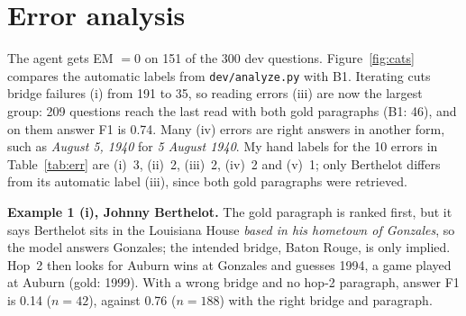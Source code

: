 \documentclass[10pt,a4paper]{article}
\begin{document}
\section{Error analysis}
\noindent\begin{minipage}[t]{0.50\textwidth}
\vspace{0pt}
The agent gets EM $=0$ on 151 of the 300 dev questions. Figure~\ref{fig:cats} compares the automatic labels from
\texttt{dev/analyze.py} with B1. Iterating cuts bridge failures (i) from 191 to 35, so reading errors (iii) are now
the largest group: 209 questions reach the last read with both gold paragraphs (B1: 46), and on them answer F1 is
0.74. Many (iv) errors are right answers in another form, such as \emph{August 5, 1940} for \emph{5 August 1940}.
My hand labels for the 10 errors in Table~\ref{tab:err} are (i)~3, (ii)~2, (iii)~2, (iv)~2 and (v)~1; only
Berthelot differs from its automatic label (iii), since both gold paragraphs were retrieved.
\end{minipage}\hfill
\begin{minipage}[t]{0.46\textwidth}
\vspace{0pt}
\centering
{}
\label{fig:cats}
\end{minipage}

\vfill
\textbf{Example 1 (i), Johnny Berthelot.} The gold paragraph is ranked first, but it says Berthelot sits in the
Louisiana House \emph{based in his hometown of Gonzales}, so the model answers Gonzales; the intended bridge, Baton
Rouge, is only implied. Hop~2 then looks for Auburn wins at Gonzales and guesses 1994, a game played at Auburn
(gold: 1999). With a wrong bridge and no hop-2 paragraph, answer F1 is 0.14 ($n{=}42$), against 0.76 ($n{=}188$)
with the right bridge and paragraph.
\end{document}
